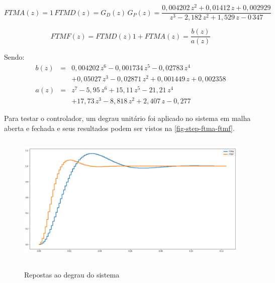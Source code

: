\documentclass[
	12pt,				%
	article,			%
	openright,			%
	oneside,
	a4paper,			%
	chapter=TITLE,		%
	section=TITLE,		%
	english,			%
	french,				%
	spanish,			%
	brazil,				%
]{abntex2}
\begin{document}
                \begin{equation}
                    \label{eq-ftma}
                    FTMA(z) = 1\,FTMD(z) = G_D(z)\,G_P(z) = \frac{0,004202\,z^2 +0,01412\,z +0,002929}{z^3 -2,182\,z^2 +1,529\,z -0\,347}
                \end{equation}
                
                \begin{equation}
                    \label{eq-ftmf}
                    FTMF(z) = {FTMD(z)}{1 + FTMA(z)} = \frac{b(z)}{a(z)}
                \end{equation}
                
                Sendo:
                \begin{eqnarray*}
                    b(z) & = & 0,004202\,z^6 -0,001734\,z^5 -0,02783\,z^4\\
                    & &        +0,05027\,z^3 -0,02871\,z^2 +0,001449\,z +0,002358 \\
                    a(z) & = & z^7 -5,95\,z^6 + 15,11\,z^5 -21,21\,z^4 \\
                    & &        +17,73\,z^3 -8,818\,z^2 +2,407\,z -0,277
                \end{eqnarray*}
                
                Para testar o controlador, um degrau unitário foi aplicado no sistema em malha aberta e fechada e seus resultados podem ser vistos na \autoref{fig-step-ftma-ftmf}.
                
                \begin{figure}[htbp]
                	\centering
                	\caption{Repostas ao degrau do sistema}
                	\includegraphics[width=\textwidth,height=240px,keepaspectratio]{imgs/ftmf/step-ftma-ftmf.png}
                	\label{fig-step-ftma-ftmf}
            	\end{figure}
                
\end{document}
